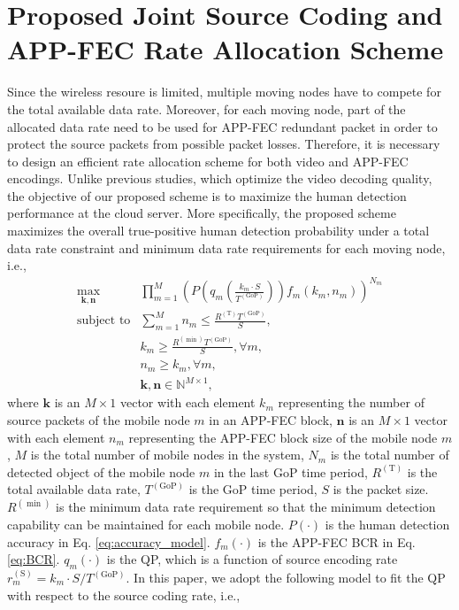 \documentclass[journal]{IEEEtran}
\begin{document}
\section{Proposed Joint Source Coding and APP-FEC Rate Allocation Scheme}
Since the wireless resoure is limited, multiple moving nodes have to compete for the total available data rate. Moreover, for each moving node, part of the allocated data rate need to be used for APP-FEC redundant packet in order to protect the source packets from possible packet losses. Therefore, it is necessary to design an efficient rate allocation scheme for both video and APP-FEC encodings. Unlike previous studies, which optimize the video decoding quality, the objective of our proposed scheme is to maximize the human detection performance at the cloud server. More specifically, the proposed scheme maximizes the overall true-positive human detection probability under a total data rate constraint and minimum data rate requirements for each moving node, i.e.,
\begin{equation}\label{eq:original_probelm}
\begin{array}{rl}
\max_{\mathbf{k,n}}&\prod_{m=1}^{M}\!\!\left(\!\!P\left(q_m\left(\frac{k_m\cdot S}{T^{\left(\text{GoP}\right)}}\right)\right)\!\!f_m\left(k_m,n_m\right)\!\!\right)^{N_m}\\
\text{subject to}&\sum_{m=1}^{M}n_m\leq\frac{R^{\left(\text{T}\right)}T^{\left(\text{GoP}\right)}}{S},\\
& k_m \geq \frac{R^{\left(\min\right)}T^{\left(\text{GoP}\right)}}{S}, \forall m,\\
& n_m \geq k_m, \forall m,\\
& \mathbf{k},\mathbf{n}\in\mathbb{N}^{M\times 1},
\end{array}
\end{equation}
where $\mathbf{k}$ is an $M\times 1$ vector with each element $k_m$ representing the number of source packets of the mobile node $m$ in an APP-FEC block, $\mathbf{n}$ is an $M\times 1$ vector with each element $n_m$ representing the APP-FEC block size of the mobile node $m$, $M$ is the total number of mobile nodes in the system, $N_m$ is the total number of detected object of the mobile node $m$ in the last GoP time period, $R^{\left(\text{T}\right)}$ is the total available data rate, $T^{\left(\text{GoP}\right)}$ is the GoP time period, $S$ is the packet size. $R^{\left(\min\right)}$ is the minimum data rate requirement so that the minimum detection capability can be maintained for each mobile node. $P\left(\cdot\right)$ is the human detection accuracy in Eq. \eqref{eq:accuracy_model}. $f_m\left(\cdot\right)$ is the APP-FEC BCR in Eq. \eqref{eq:BCR}. $q_m\left(\cdot\right)$ is the QP, which is a function of source encoding rate $r_m^{\left(\text{S}\right)}=k_m\cdot S/T^{\left(\text{GoP}\right)}$. In this paper, we adopt the following model to fit the QP with respect to the source coding rate, i.e.,
\end{document}
